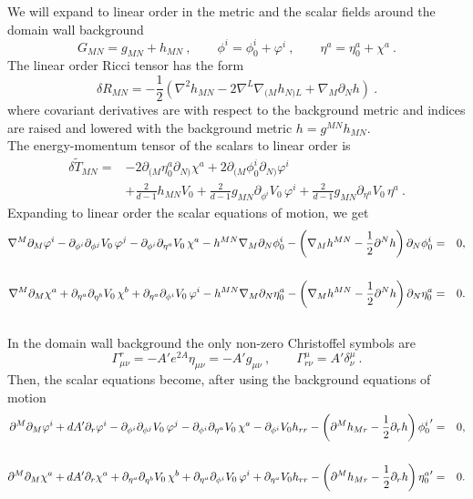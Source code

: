 We will expand to linear order in the metric and the scalar fields around the domain wall background
\begin{equation}
	G_{MN}=g_{MN}+h_{MN}
	\ ,\qquad \phi^i=\phi^i_0+\varphi^i
	\ ,\qquad 
	\eta^a=\eta^a_0+\chi^a\ .
\end{equation}
The linear order Ricci tensor has the form
\begin{equation}
   \delta R_{MN}= -\frac{1}{2}\left(\nabla^2 h_{MN}-2\nabla^L \nabla_{(M}h_{N)L}+\nabla_M \partial_N h\right)\ .
\end{equation}
where covariant derivatives are with respect to the background metric and indices are raised and lowered with the background metric $h=g^{MN}h_{MN}$.\\
The energy-momentum tensor of the scalars to linear order is
\begin{equation}
\begin{split}
     \delta \widetilde T_{MN}=&-2\partial_{(M}\eta_0^a \partial_{N)}\chi^a+2\partial_{(M}\phi_0^i \partial_{N)}\varphi^i\\
     &+\frac{2}{d-1}h_{MN}V_0+\frac{2}{d-1}g_{MN}\partial_{\phi^i} V_0\,\varphi^i+\frac{2}{d-1}g_{MN}\partial_{\eta^a} V_0\,\eta^a\ .
	\end{split}
\end{equation}
Expanding to linear order the scalar equations of motion, we get
\begin{eqnarray}
\notag \nabla^M \partial_M \varphi^i-\partial_{\phi^i}\partial_{\phi^j} V_0\,\varphi^j-\partial_{\phi^i}\partial_{\eta^a} V_0\,\chi^a-h^{MN}\nabla_M\partial_N \phi_0^i-\left(\nabla_M h^{MN}-\frac{1}{2}\partial^N h\right)\partial_N\phi^i_0 &=&0, \\
& & \\
\notag \nabla^M \partial_M \chi^a+\partial_{\eta^a}\partial_{\eta^b} V_0\,\chi^b+\partial_{\eta^a}\partial_{\phi^i} V_0\,\varphi^i-h^{MN}\nabla_M\partial_N \eta_0^a-\left(\nabla_M h^{MN}-\frac{1}{2}\partial^N h\right)\partial_N\eta^a_0 &=&0.\\ & &
\end{eqnarray}
In the domain wall background the only non-zero Christoffel symbols are
\begin{equation}
	\Gamma^r_{\mu\nu}=-A' e^{2A}\eta_{\mu\nu}=-A' g_{\mu\nu}
	\ , \qquad 
	\Gamma^\mu_{r\nu}=A' \delta^\mu_\nu\ .
\end{equation}
Then, the scalar equations become, after using the background equations of motion
\begin{eqnarray}
\notag \partial^M \partial_M \varphi^i+dA'\partial_r\varphi^i -\partial_{\phi^i}\partial_{\phi^j} V_0\,\varphi^j-\partial_{\phi^i}\partial_{\eta^a} V_0\,\chi^a-\partial_{\phi^i} V_0 h_{rr} -\left(\partial^M h_{Mr}-\frac{1}{2}\partial_r h\right){\phi_0^i}' &=&0, \\ & & \\
\notag \partial^M \partial_M \chi^a+dA'\partial_r\chi^a +\partial_{\eta^a}\partial_{\eta^b} V_0\,\chi^b+\partial_{\eta^a}\partial_{\phi^i} V_0\,\varphi^i+\partial_{\eta^a} V_0 h_{rr} -\left(\partial^M h_{Mr}-\frac{1}{2}\partial_r h\right){\eta_0^a}' &=&0 .\\ \label{eq:chieq} & &
\end{eqnarray}
